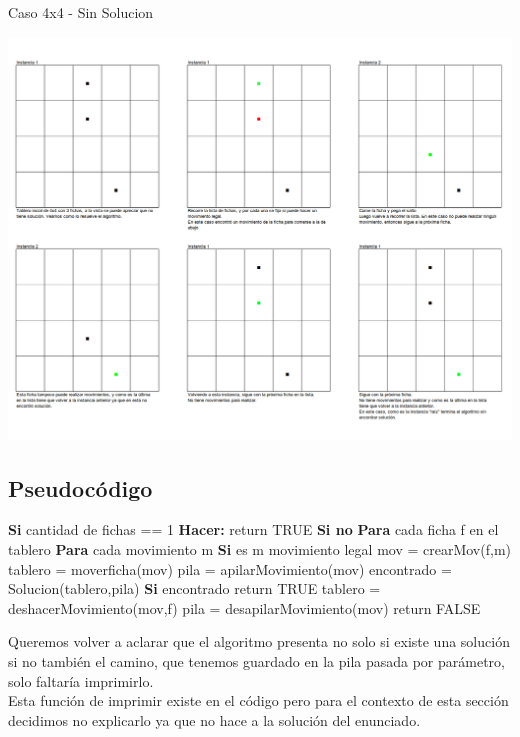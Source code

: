 {\huge Caso 4x4 - Sin Solucion}
\begin {center}
\includegraphics[width=20cm]{./SinSolucion4x4_2filas.png}\\
\end {center}


\subsection{Pseudoc\'odigo}

\begin{codebox}
\li	\textbf{Si} cantidad de fichas == 1 \textbf{Hacer:} \Do
\li		return TRUE \End
\li	\textbf{Si no}  \Do
\li		\textbf{Para} cada ficha f en el tablero \Do
\li			\textbf{Para} cada movimiento m \Do
\li				\textbf{Si} es m movimiento legal \Do
\li					mov = crearMov(f,m)
\li					tablero = moverficha(mov)
\li					pila = apilarMovimiento(mov)
\li					encontrado = Solucion(tablero,pila)
\li					\textbf{Si} encontrado \Do
\li						return TRUE  \End
\li					tablero = deshacerMovimiento(mov,f)
\li					pila = desapilarMovimiento(mov) \End \End \End
\li		return FALSE \End
\end{codebox}

\mbox{}

Queremos volver a aclarar que el algoritmo presenta no solo si existe una solución si no también el camino, 
que tenemos guardado en la pila pasada por parámetro, solo faltaría imprimirlo. \\
Esta función de imprimir existe en el código pero para el contexto de esta sección decidimos no explicarlo
ya que no hace a la solución del enunciado.


